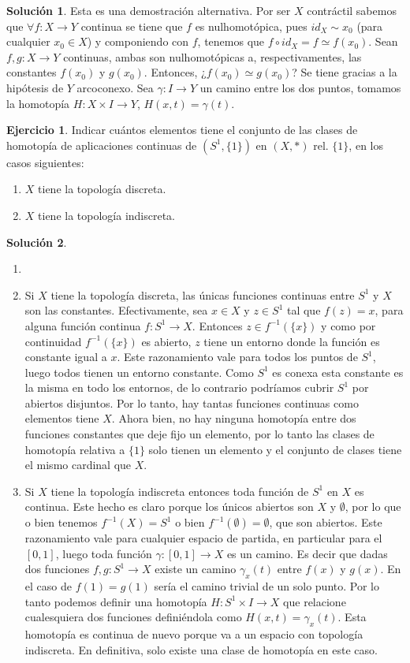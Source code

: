 \documentclass{article}
\theoremstyle{plain}
\theoremstyle{definition}
\newtheorem{exercise}{Ejercicio}
\newtheorem*{sol*}{Solución}
\begin{document}
\begin{sol*}
Esta es una demostración alternativa. Por ser $X$ contráctil sabemos que $\forall f:X\to Y$ continua se tiene que $f$ es nulhomotópica, pues $id_X \sim x_0$ (para cualquier $x_0\in X$) y componiendo con $f$, tenemos que $f \circ id_X = f \simeq f(x_0)$. Sean $f,g:X\to Y$ continuas, ambas son nulhomotópicas a, respectivamentes, las constantes $f(x_0)$ y $g(x_0)$. Entonces, ¿$f(x_0)\simeq g(x_0)$? Se tiene gracias a la hipótesis de $Y$ arcoconexo. Sea $\gamma:I\to Y$ un camino entre los dos puntos, tomamos la homotopía $H:X\times I \to Y$, $H(x,t)=\gamma(t)$.
\end{sol*}
\newpage
\begin{exercise}
Indicar cuántos elementos tiene el conjunto de las clases de homotopía de aplicaciones continuas de $(S^1,\{1\})$ en $(X,*)$ rel. $\{1\}$, en los casos siguientes:
\begin{enumerate}
\item $X$ tiene la topología discreta.
\item $X$ tiene la topología indiscreta.
\end{enumerate}

\end{exercise}
\begin{sol*}
\begin{enumerate}
\item[]
\item Si $X$ tiene la topología discreta, las únicas funciones continuas entre $S^1$ y $X$ son las constantes. Efectivamente, sea $x\in X$ y $z\in S^1$ tal que $f(z)=x$, para alguna función continua $f:S^1\to X$. Entonces $z\in f^{-1}(\{x\})$ y como por continuidad $f^{-1}(\{x\})$ es abierto, $z$ tiene un entorno donde la función es constante igual a $x$. Este razonamiento vale para todos los puntos de $S^1$, luego todos tienen un entorno constante. Como $S^1$ es conexa esta constante es la misma en todo los entornos, de lo contrario podríamos cubrir $S^1$ por abiertos disjuntos. Por lo tanto, hay tantas funciones continuas como elementos tiene $X$. Ahora bien, no hay ninguna homotopía entre dos funciones constantes que deje fijo un elemento, por lo tanto las clases de homotopía relativa a $\{1\}$ solo tienen un elemento y el conjunto de clases tiene el mismo cardinal que $X$. 
\item Si $X$ tiene la topología indiscreta entonces toda función de $S^1$ en $X$ es continua. Este hecho es claro porque los únicos abiertos son $X$ y $\emptyset$, por lo que o bien tenemos $f^{-1}(X)=S^1$ o bien $f^{-1}(\emptyset)=\emptyset$, que son abiertos. Este razonamiento vale para cualquier espacio de partida, en particular para el $[0,1]$, luego toda función $\gamma:[0,1]\to X$ es un camino. Es decir que dadas dos funciones $f,g:S^1\to X$ existe un camino $\gamma_x(t)$ entre $f(x)$ y $g(x)$. En el caso de $f(1)=g(1)$ sería el camino trivial de un solo punto. Por lo tanto podemos definir una homotopía $H:S^1\times I\to X$ que relacione cualesquiera dos funciones definiéndola como $H(x,t)=\gamma_x(t)$. Esta homotopía es continua de nuevo porque va a un espacio con topología indiscreta. En definitiva, solo existe una clase de homotopía en este caso.
\end{enumerate}
\end{sol*}
\end{document}
